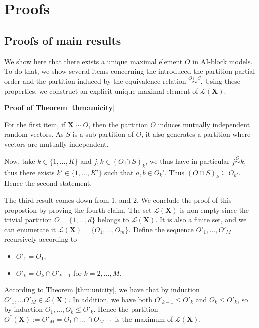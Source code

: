 \documentclass[11pt]{article}
\makeatletter
\renewenvironment{proof}[1][\proofname]{\par
\pushQED{\qed}%
\normalfont \topsep6\p@\@plus6\p@\relax
\trivlist
\item\relax
{\textbf{
#1\@addpunct{ }}}\hspace\labelsep\ignorespaces
}{%
\popQED\endtrivlist\@endpefalse
}
\makeatother
\begin{document}
	
	
	
    
    
    \appendix
    \section{Proofs}
    \label{sec:proof}
        \subsection{Proofs of  main results}
        \label{subsec:main_results}
		We show here that there exists a unique maximal element $\bar{O}$ in AI-block models. To do that, we show several items concerning the introduced the partition partial order and the partition induced by the equivalence relation $\overset{O \cap S}{\sim}$. Using these properties, we construct an explicit unique maximal element of $\mathcal{L}(\textbf{X})$.
		\begin{proof}[Proof of Theorem \ref{thm:unicity}]
		For the first item, if $\textbf{X} \sim O$, then the partition $O$ induces mutually independent random vectors. As $S$ is a sub-partition of $O$, it also generates a partition where vectors are mutually independent.
		
		Now, take $k \in \{1,\dots,K\}$ and $j,k \in (O \cap S)_k$, we thus have in particular $j \overset{O}{\sim} k$, thus there exists $k' \in \{1,\dots, K'\}$ such that $a,b \in O_k'$. Thus $(O \cap S)_k \subseteq O_{k'}$. Hence the second statement.
		
		The third result comes down from 1. and 2. We conclude the proof of this propostion by proving the fourth claim. The set $\mathcal{L}(\textbf{X})$ is non-empty since the trivial partition $O = \{1,\dots,d\}$ belongs to $\mathcal{L}(\textbf{X})$. It is also a finite set, and we can enumerate it $\mathcal{L}(\textbf{X}) = \{O_1, \dots, O_m\}$. Define the sequence $O'_1, \dots, O'_M$ recursively according to
		\begin{itemize}
			\item $O'_1 = O_1$,
			\item $O'_k = O_k \cap O'_{k-1}$ for $k = 2,\dots, M$.
		\end{itemize}
		According to Theorem \ref{thm:unicity}, we have that by induction $O'_1, \dots O'_M \in \mathcal{L}(\textbf{X})$. In addition, we have both $O'_{k-1} \leq O'_k$ and $O_k \leq O'_k$, so by induction $O_1, \dots, O_k \leq O'_k$. Hence the partition $O^*(\textbf{X}) := O'_M = O_1 \cap \dots  \cap O_{M-1}$ is the maximum of $\mathcal{L}(\textbf{X})$.
	\end{proof}
	
\end{document}
